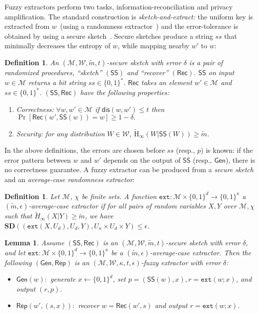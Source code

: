 \documentclass[11pt]{article}
\newcommand{\class}[1]{{\ensuremath{\mathsf{#1}}}}
\newcommand{\gen}{\ensuremath{\class{Gen}}\xspace}
\newcommand{\rep}{\ensuremath{\class{Rep}}\xspace}
\newcommand{\sketch}{\ensuremath{\class{SS}}\xspace}
\newcommand{\rec}{\ensuremath{\class{Rec}}\xspace}
\newcommand{\zo}{\ensuremath{\{0, 1\}}}
\newcommand{\dis}{\ensuremath{\mathsf{dis}}}
\newcommand{\Hav}{\tilde{\mathrm{H}}_\infty}
\newcommand{\ext}{\ensuremath{\mathtt{ext}}}
\newcommand{\sd}{\ensuremath{\mathbf{SD}}}
\newtheorem{lemma}[theorem]{Lemma}
\newtheorem{definition}[theorem]{Definition}
\begin{document}
\noindent
Fuzzy extractors perform two tasks, information-reconciliation and privacy amplification.  The standard construction is \emph{sketch-and-extract:} the uniform key is extracted from $w$~(using a randomness extractor~\cite{nisan1993randomness}) and the error-tolerance is obtained by using a secure sketch~\cite[Lemma 4.1]{DBLP:journals/siamcomp/DodisORS08}.  Secure sketches produce a string $ss$ that minimally decreases the entropy of $w$, while mapping nearby $w'$ to $w$:
\begin{definition}
\label{def:secure sketch}
An $(\mathcal{M},\mathcal{W}, \tilde{m}, t)$-\emph{secure sketch} with error $\delta$ is a pair of randomized procedures, ``sketch'' $(\sketch)$ and ``recover'' $(\rec)$.  \sketch on input $w\in\mathcal{M}$ returns a bit string $ss\in\{0,1\}^*$.  \rec takes an element $w'\in\mathcal{M}$ and $ss\in\{0,1\}^*$.  $(\sketch, \rec)$ have the following properties:
\begin{enumerate}
\item \emph{Correctness}: $ \forall w, w'\in\mathcal{M}$ if $\dis(w,w')\leq t$ then $\Pr[\rec(w',\sketch(w))=w]\geq 1-\delta.$
\item \emph{Security}: for any distribution $W\in\mathcal{W}$, $\Hav(W|\sketch(W))\geq \tilde{m}$.
\end{enumerate}
\end{definition}

\noindent In the above definitions, the errors are chosen before $ss$ (resp., $p$) is known: if the error pattern between $w$ and $w'$ depends on the output of $\sketch$ (resp., $\gen$),  there is no correctness guarantee.  
A fuzzy extractor can be produced from a \emph{secure sketch} and an \emph{average-case randomness extractor}:

\begin{definition}
Let $\mathcal{M}$, $\chi$ be finite sets.
A function $\ext: \mathcal{M}\times \{0,1\}^d \rightarrow \{0,1\}^\kappa$ a \emph{$(\tilde{m}, \epsilon)$-average-case extractor} if for all pairs
of random variables $X, Y$ over $\mathcal{M}, \chi$ such that
$\tilde{H}_\infty(X|Y) \ge \tilde{m}$, we have $\sd((\ext(X, U_d), U_d, Y), U_\kappa\times
U_d \times Y) \le \epsilon$.
\end{definition}

\begin{lemma}
\label{lem:fuzzy ext construction}
Assume $(\sketch, \rec)$ is an $(\mathcal{M}, \mathcal{W}, \tilde{m}, t)$-secure sketch with error $\delta$, and let $\ext:\mathcal{M}\times \zo^d \rightarrow \zo^\kappa$ be a $(\tilde{m}, \epsilon)$-average-case extractor.  Then the following $(\gen, \rep)$ is an $(\mathcal{M}, \mathcal{W}, \kappa, t, \epsilon)$-fuzzy extractor with error $\delta$:
\begin{itemize}
\item $\gen(w):$ generate $x\leftarrow \zo^d$, set $p=(\sketch(w), x), r=\ext(w;x)$, and output $(r,p)$.
\item $\rep(w', (s, x)):$ recover $w=\rec(w',s)$ and output $r=\ext(w;x)$.
\end{itemize}
\end{lemma}
\end{document}

